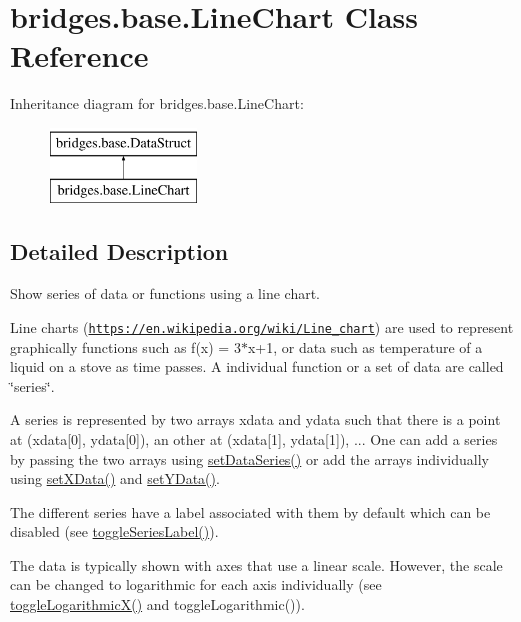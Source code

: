\hypertarget{classbridges_1_1base_1_1_line_chart}{}\section{bridges.\+base.\+Line\+Chart Class Reference}
\label{classbridges_1_1base_1_1_line_chart}
Inheritance diagram for bridges.\+base.\+Line\+Chart\+:\begin{figure}[H]
\begin{center}
\leavevmode
\includegraphics[height=2.000000cm]{classbridges_1_1base_1_1_line_chart}
\end{center}
\end{figure}


\subsection{Detailed Description}
Show series of data or functions using a line chart. 

Line charts (\href{https://en.wikipedia.org/wiki/Line_chart}{\tt https\+://en.\+wikipedia.\+org/wiki/\+Line\+\_\+chart}) are used to represent graphically functions such as f(x) = 3$\ast$x+1, or data such as temperature of a liquid on a stove as time passes. A individual function or a set of data are called \char`\"{}series\char`\"{}.

A series is represented by two arrays xdata and ydata such that there is a point at (xdata\mbox{[}0\mbox{]}, ydata\mbox{[}0\mbox{]}), an other at (xdata\mbox{[}1\mbox{]}, ydata\mbox{[}1\mbox{]}), ... One can add a series by passing the two arrays using \hyperlink{classbridges_1_1base_1_1_line_chart_a586e9953b13e51ab9e592acfb034887b}{set\+Data\+Series()} or add the arrays individually using \hyperlink{classbridges_1_1base_1_1_line_chart_a2918179283e8280d47abb43df3c59195}{set\+X\+Data()} and \hyperlink{classbridges_1_1base_1_1_line_chart_a3076dc99debb599529169de40815aba2}{set\+Y\+Data()}.

The different series have a label associated with them by default which can be disabled (see \hyperlink{classbridges_1_1base_1_1_line_chart_adae74cfb09585727a96cf74ddf74d098}{toggle\+Series\+Label()}).

The data is typically shown with axes that use a linear scale. However, the scale can be changed to logarithmic for each axis individually (see \hyperlink{classbridges_1_1base_1_1_line_chart_ad3e5e54c382ac605a81b6b61c250ad16}{toggle\+Logarithmic\+X()} and toggle\+Logarithmic()).

